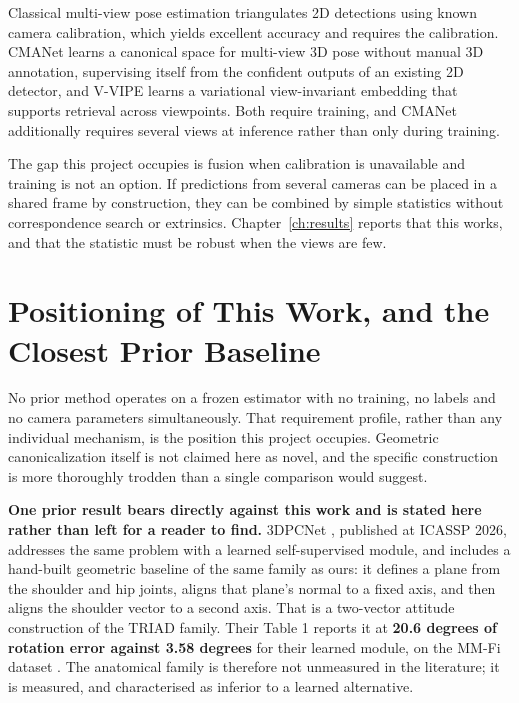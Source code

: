 \documentclass[12pt,a4paper]{report}
\begin{document}
Classical multi-view pose estimation triangulates 2D detections using known
camera calibration, which yields excellent accuracy and requires the
calibration. CMANet \cite{cmanet} learns a canonical space for multi-view 3D pose without
manual 3D annotation, supervising itself from the confident outputs of an
existing 2D detector, and V-VIPE learns a variational view-invariant embedding
that supports retrieval across viewpoints. Both require training, and CMANet
additionally requires several views at inference rather than only during
training.

The gap this project occupies is fusion when calibration is unavailable and
training is not an option. If predictions from several cameras can be placed in a
shared frame by construction, they can be combined by simple statistics without
correspondence search or extrinsics. Chapter~\ref{ch:results} reports that this
works, and that the statistic must be robust when the views are few.

\section{Positioning of This Work, and the Closest Prior Baseline}
\label{sec:positioning}

No prior method operates on a frozen estimator with no training, no labels and no
camera parameters simultaneously. That requirement profile, rather than any
individual mechanism, is the position this project occupies. Geometric
canonicalization itself is not claimed here as novel, and the specific
construction is more thoroughly trodden than a single comparison would suggest.

\textbf{One prior result bears directly against this work and is stated here
rather than left for a reader to find.} 3DPCNet \cite{3dpcnet}, published at ICASSP 2026,
addresses the same problem with a learned self-supervised module, and includes a
hand-built geometric baseline of the same family as ours: it defines a plane from
the shoulder and hip joints, aligns that plane's normal to a fixed axis, and then
aligns the shoulder vector to a second axis. That is a two-vector attitude
construction of the TRIAD family. Their Table 1 reports it at \textbf{20.6
degrees of rotation error against 3.58 degrees} for their learned module, on the
MM-Fi dataset \cite{mmfi}. The anatomical family is therefore not unmeasured in the
literature; it is measured, and characterised as inferior to a learned
alternative.
\end{document}
